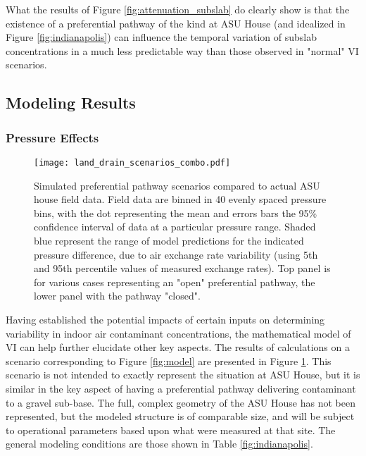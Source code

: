 \documentclass[journal=esthag,manuscript=article]{achemso}
\begin{document}
What the results of Figure \ref{fig:attenuation_subslab} do clearly show is that the existence of a preferential pathway of the kind at ASU House (and idealized in Figure \ref{fig:indianapolis}) can influence the temporal variation of subslab concentrations in a much less predictable way than those observed in "normal" VI scenarios.\par

\subsection{Modeling Results}

\subsubsection{Pressure Effects}

\begin{figure}[htb!]
 \centering
 \caption{Simulated preferential pathway scenarios compared to actual ASU house field data. Field data are binned in 40 evenly spaced pressure bins, with the dot representing the mean and errors bars the 95\% confidence interval of data at a particular pressure range. Shaded blue represent the range of model predictions for the indicated pressure difference, due to air exchange rate variability (using 5th and 95th percentile values of measured exchange rates). Top panel is for various cases representing an "open" preferential pathway, the lower panel with the pathway "closed". }\label{fig:land_drain_scenarios}
 \texttt{[image: land\_drain\_scenarios\_combo.pdf]}
\end{figure}

Having established the potential impacts of certain inputs on determining variability in indoor air contaminant concentrations, the mathematical model of VI can help further elucidate other key aspects.
The results of calculations on a scenario corresponding to Figure \ref{fig:model} are presented in Figure \ref{fig:land_drain_scenarios}.
This scenario is not intended to exactly represent the situation at ASU House, but it is similar in the key aspect of having a preferential pathway delivering contaminant to a gravel sub-base.
The full, complex geometry of the ASU House has not been represented, but the modeled structure is of comparable size, and will be subject to operational parameters based upon what were measured at that site.
The general modeling conditions are those shown in Table \ref{fig:indianapolis}.\par
\end{document}

